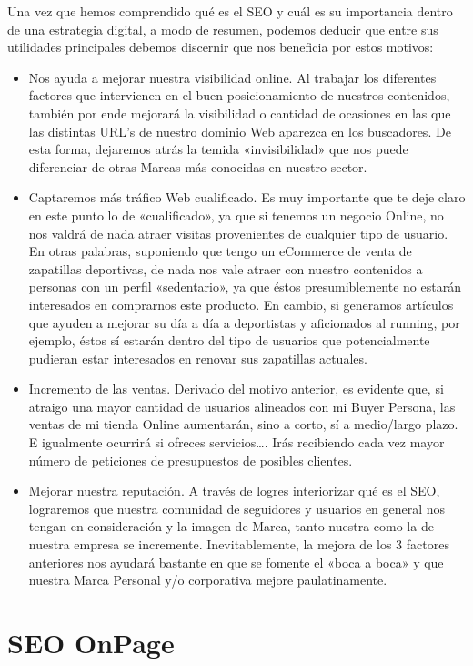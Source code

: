 Una vez que hemos comprendido qué es el SEO y cuál es su importancia dentro de una estrategia digital, a modo de resumen, podemos deducir que entre sus utilidades principales debemos discernir que nos beneficia por estos motivos:
\begin{itemize}
    \item Nos ayuda a mejorar nuestra visibilidad online. Al trabajar los diferentes factores que intervienen en el buen posicionamiento de nuestros contenidos, también por ende mejorará la visibilidad o cantidad de ocasiones en las que las distintas URL’s de nuestro dominio Web aparezca en los buscadores. De esta forma, dejaremos atrás la temida «invisibilidad» que nos puede diferenciar de otras Marcas más conocidas en nuestro sector.
    \item Captaremos más tráfico Web cualificado. Es muy importante que te deje claro en este punto lo de «cualificado», ya que si tenemos un negocio Online, no nos valdrá de nada atraer visitas provenientes de cualquier tipo de usuario.
    En otras palabras, suponiendo que tengo un eCommerce de venta de zapatillas deportivas, de nada nos vale atraer con nuestro contenidos a personas con un perfil «sedentario», ya que éstos presumiblemente no estarán interesados en comprarnos este producto.
    En cambio, si generamos artículos que ayuden a mejorar su día a día a deportistas y aficionados al running, por ejemplo, éstos sí estarán dentro del tipo de usuarios que potencialmente pudieran estar interesados en renovar sus zapatillas actuales.
    \item Incremento de las ventas. Derivado del motivo anterior, es evidente que, si atraigo una mayor cantidad de usuarios alineados con mi Buyer Persona, las ventas de mi tienda Online aumentarán, sino a corto, sí a medio/largo plazo. E igualmente ocurrirá si ofreces servicios…. Irás recibiendo cada vez mayor número de peticiones de presupuestos de posibles clientes.
    \item Mejorar nuestra reputación. A través de logres interiorizar qué es el SEO, lograremos que nuestra comunidad de seguidores y usuarios en general nos tengan en consideración y la imagen de Marca, tanto nuestra como la de nuestra empresa se incremente. Inevitablemente, la mejora de los 3 factores anteriores nos ayudará bastante en que se fomente el «boca a boca» y que nuestra Marca Personal y/o corporativa mejore paulatinamente.
\end{itemize}

\section{SEO OnPage}

